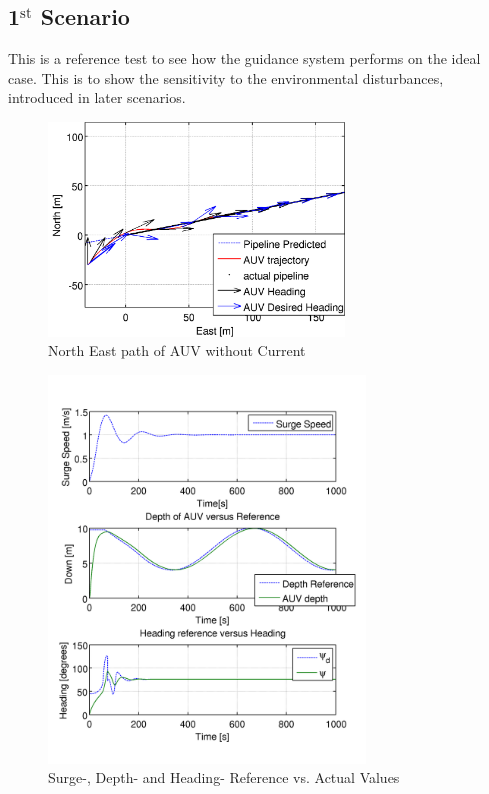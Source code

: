 	\subsection{1$^{\mathrm{st}}$ Scenario}
		This is a reference test to see how the guidance system performs on the ideal case.
		This is to show the sensitivity to the environmental disturbances, introduced in later scenarios.
		\begin{figure}[htbp]
			\centering
			\includegraphics[width=0.7\textwidth]{pics/1st_NE_path}
			\caption{North East path of AUV without Current}
			\label{fig:ch3_1st_NE_path}
		\end{figure}
		\begin{figure}[htbp]
			\centering
			\includegraphics[width=0.75\textwidth]{pics/1st_uDpsi}
			\caption{Surge-, Depth- and Heading- Reference vs. Actual Values}
			\label{fig:ch3_1st_uDpsi}
		\end{figure}
		
